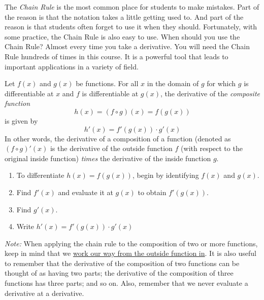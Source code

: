 \noindent The \emph{Chain Rule} is the most common place for students to make mistakes. Part of the reason is that the notation takes a little getting used to. And part of the reason is that students often forget to use it when they should. Fortunately, with some practice, the Chain Rule is also easy to use. 
\noindent When should you use the Chain Rule? Almost every time you take a derivative. You will need the Chain Rule hundreds of times in this course. It is a powerful tool that leads to important applications in a variety of field. 
\begin{tcolorbox}[title = {The Chain Rule}]

\noindent Let $f(x)$ and $g(x)$ be functions. For all $x$ in the domain of $g$ for which $g$ is differentiable at $x$ and $f$ is differentiable at $g(x)$, the derivative of the \emph{composite function} \\
\begin{equation}
    h(x)=(f\circ g)(x)=f(g(x))
\end{equation}
is given by
\begin{equation}
    h'(x)=f'(g(x))\cdot g'(x)
\end{equation}
\noindent In other words, the derivative of a composition of a function (denoted as \((f\circ g)'(x)\) is the derivative of the outside function $f$ (with respect to the original inside function) \emph{times} the derivative of the inside function $g$.
\end{tcolorbox}
\begin{tcolorbox}[title = {Steps to Apply The Chain Rule}]
\begin{enumerate}
    \item To differentiate \(h(x)=f(g(x))\), begin by identifying \(f(x)\) and \(g(x)\).
    \item Find $f'(x)$ and evaluate it at $g(x)$ to obtain $f'(g(x))$.
    \item Find $g'(x)$.
    \item Write \(h'(x)=f'(g(x))\cdot g'(x)\)
\end{enumerate}
\emph{Note:} When applying the chain rule to the composition of two or more functions, keep in mind that we \underline{work our way from the outside function in}. It is also useful to remember that the derivative of the composition of two functions can be thought of as having two parts; the derivative of the composition of three functions has three parts; and so on. Also, remember that we never evaluate a derivative at a derivative.
\end{tcolorbox}
